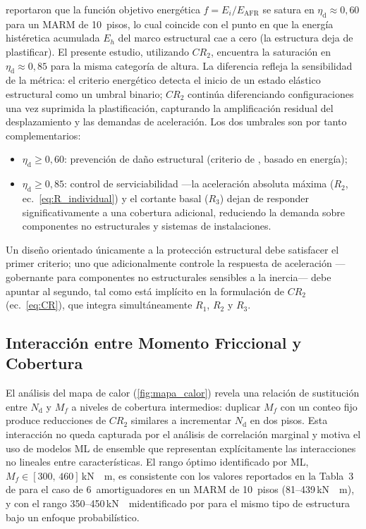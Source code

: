 \documentclass[preprint,12pt,authoryear]{elsarticle}
\newcommand{\nd}{N_{\mathrm{d}}}
\newcommand{\etad}{\eta_{\mathrm{d}}}
\newcommand{\Mf}{M_{\!f}}
\newcommand{\KM}{\,\si{kN{\cdot}m}}
\begin{document}
\citet{Jarrahi2020sdee} reportaron que la función objetivo energética
$f = E_i / E_{\mathrm{AFR}}$ se satura en $\etad \approx 0{,}60$ para un
MARM de 10~pisos, lo cual coincide con el punto en que la energía histéretica
acumulada $E_h$ del marco estructural cae a cero (la estructura deja de
plastificar). El presente estudio, utilizando $CR_2$, encuentra la saturación
en $\etad \approx 0{,}85$ para la misma categoría de altura. La diferencia
refleja la sensibilidad de la métrica: el criterio energético detecta el
inicio de un estado elástico estructural como un umbral binario; $CR_2$
continúa diferenciando configuraciones una vez suprimida la plastificación,
capturando la amplificación residual del desplazamiento y las demandas de
aceleración. Los dos umbrales son por tanto complementarios:
\begin{itemize}
    \item $\etad \geq 0{,}60$: prevención de daño estructural (criterio de
          \citealt{Jarrahi2020sdee}, basado en energía);
    \item $\etad \geq 0{,}85$: control de serviciabilidad ---la aceleración
          absoluta máxima ($R_2$, ec.~\ref{eq:R_individual}) y el cortante
          basal ($R_3$) dejan de responder significativamente a una cobertura
          adicional, reduciendo la demanda sobre componentes no estructurales
          y sistemas de instalaciones.
\end{itemize}
Un diseño orientado únicamente a la protección estructural debe satisfacer el
primer criterio; uno que adicionalmente controle la respuesta de aceleración
---gobernante para componentes no estructurales sensibles a la inercia---
debe apuntar al segundo, tal como está implícito en la formulación de $CR_2$
(ec.~\ref{eq:CR}), que integra simultáneamente $R_1$, $R_2$ y $R_3$.

\subsection{Interacción entre Momento Friccional y Cobertura}

El análisis del mapa de calor (\cref{fig:mapa_calor}) revela una relación de
sustitución entre $\nd$ y $\Mf$ a niveles de cobertura intermedios: duplicar
$\Mf$ con un conteo fijo produce reducciones de $CR_2$ similares a
incrementar $\nd$ en dos pisos. Esta interacción no queda capturada por el
análisis de correlación marginal y motiva el uso de modelos ML de ensemble
que representan explícitamente las interacciones no lineales entre
características. El rango óptimo identificado por ML, $\Mf \in [300,\,460]$\KM,
es consistente con los valores reportados en la Tabla~3 de
\citet{Jarrahi2020sdee} para el caso de 6~amortiguadores en un MARM de
10~pisos (81--439\KM), y con el rango 350--450\KM identificado por
\citet{Ponce2026} para el mismo tipo de estructura bajo un enfoque
probabilístico.
\end{document}
